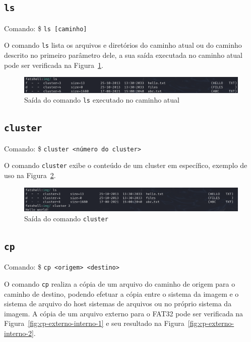 \documentclass[
    12pt,				%
    oneside,   	        %
    a4paper,			%
    english,			%
    french,				%
    spanish,			%
    brazil,				%
    ]{pacotes/abntex2}
\begin{document}

\subsection{\texttt{ls}}
\label{subsec:ls}
Comando: \$ \texttt{ls [caminho]} 

O comando \texttt{ls} lista os arquivos e diretórios do caminho atual ou do caminho descrito no primeiro parâmetro dele, a sua saída executada no caminho atual pode ser verificada na Figura~\ref{fig:ls}.

\begin{figure}[H]
    \centering
    \includegraphics[width=450pt]{figuras/resultados/1-ls.PNG}
    \caption{Saída do comando \texttt{ls} executado no caminho atual}
    \label{fig:ls}
\end{figure}


\subsection{\texttt{cluster}}
\label{subsec:cluster}
Comando: \$ \texttt{cluster <número do cluster>}

O comando \texttt{cluster} exibe o conteúdo de um cluster em específico, exemplo de uso na Figura~\ref{fig:cluester}.

\begin{figure}[H]
    \centering
    \includegraphics[width=450pt]{figuras/resultados/2-cluster.PNG}
    \caption{Saída do comando \texttt{cluster}}
    \label{fig:cluester}
\end{figure}


\subsection{\texttt{cp}}
\label{subsec:cp}
Comando: \$ \texttt{cp <origem> <destino>}  

O comando \texttt{cp} realiza a cópia de um arquivo do caminho de origem para o caminho de destino, podendo efetuar a cópia entre o sistema da imagem e o sistema de arquivo do host sistemas de arquivos ou no próprio sistema da imagem. A cópia de um arquivo externo para o FAT32 pode ser verificada na Figura~\ref{fig:cp-externo-interno-1} e seu resultado na Figura~\ref{fig:cp-externo-interno-2}.
\end{document}
